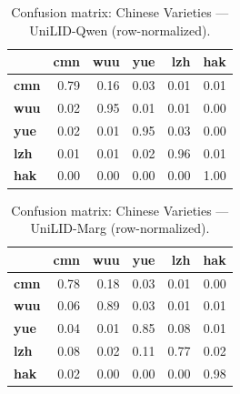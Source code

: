 \begin{table}[htbp]
\centering
\small
\begin{tabular}{lrrrrr}
\toprule
 & \textbf{cmn} & \textbf{wuu} & \textbf{yue} & \textbf{lzh} & \textbf{hak} \\
\midrule
\textbf{cmn} & \cellcolor{blue!78}\color{white}0.79 & \cellcolor{blue!16}0.16 & \cellcolor{blue!3}0.03 & \cellcolor{blue!1}0.01 & \cellcolor{blue!0}0.01 \\
\textbf{wuu} & \cellcolor{blue!2}0.02 & \cellcolor{blue!95}\color{white}0.95 & \cellcolor{blue!1}0.01 & \cellcolor{blue!1}0.01 & \cellcolor{blue!0}0.00 \\
\textbf{yue} & \cellcolor{blue!1}0.02 & \cellcolor{blue!0}0.01 & \cellcolor{blue!95}\color{white}0.95 & \cellcolor{blue!2}0.03 & \cellcolor{blue!0}0.00 \\
\textbf{lzh} & \cellcolor{blue!0}0.01 & \cellcolor{blue!0}0.01 & \cellcolor{blue!1}0.02 & \cellcolor{blue!96}\color{white}0.96 & \cellcolor{blue!0}0.01 \\
\textbf{hak} & \cellcolor{blue!0}0.00 & \cellcolor{blue!0}0.00 & \cellcolor{blue!0}0.00 & \cellcolor{blue!0}0.00 & \cellcolor{blue!100}\color{white}1.00 \\
\bottomrule
\end{tabular}
\caption{Confusion matrix: Chinese Varieties — UniLID-Qwen (row-normalized).}
\label{tab:cm-chinese_varieties-unilid-qwen}
\end{table}

\begin{table}[htbp]
\centering
\small
\begin{tabular}{lrrrrr}
\toprule
 & \textbf{cmn} & \textbf{wuu} & \textbf{yue} & \textbf{lzh} & \textbf{hak} \\
\midrule
\textbf{cmn} & \cellcolor{blue!77}\color{white}0.78 & \cellcolor{blue!17}0.18 & \cellcolor{blue!3}0.03 & \cellcolor{blue!1}0.01 & \cellcolor{blue!0}0.00 \\
\textbf{wuu} & \cellcolor{blue!6}0.06 & \cellcolor{blue!88}\color{white}0.89 & \cellcolor{blue!2}0.03 & \cellcolor{blue!0}0.01 & \cellcolor{blue!1}0.01 \\
\textbf{yue} & \cellcolor{blue!4}0.04 & \cellcolor{blue!1}0.01 & \cellcolor{blue!85}\color{white}0.85 & \cellcolor{blue!8}0.08 & \cellcolor{blue!1}0.01 \\
\textbf{lzh} & \cellcolor{blue!7}0.08 & \cellcolor{blue!2}0.02 & \cellcolor{blue!10}0.11 & \cellcolor{blue!76}\color{white}0.77 & \cellcolor{blue!2}0.02 \\
\textbf{hak} & \cellcolor{blue!1}0.02 & \cellcolor{blue!0}0.00 & \cellcolor{blue!0}0.00 & \cellcolor{blue!0}0.00 & \cellcolor{blue!98}\color{white}0.98 \\
\bottomrule
\end{tabular}
\caption{Confusion matrix: Chinese Varieties — UniLID-Marg (row-normalized).}
\label{tab:cm-chinese_varieties-unilid-marg}
\end{table}


